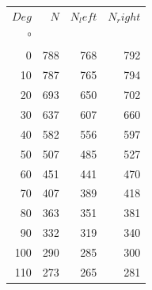 \begin{table}[H]
\begin{tabular}{rrrr}
\toprule
$Deg$ & $N$ & $N_left$ & $N_right$ \\
\si[]{\degree} & \si[]{} & \si[]{} & \si[]{} \\
\midrule
0 & 788 & 768 & 792 \\
10 & 787 & 765 & 794 \\
20 & 693 & 650 & 702 \\
30 & 637 & 607 & 660 \\
40 & 582 & 556 & 597 \\
50 & 507 & 485 & 527 \\
60 & 451 & 441 & 470 \\
70 & 407 & 389 & 418 \\
80 & 363 & 351 & 381 \\
90 & 332 & 319 & 340 \\
100 & 290 & 285 & 300 \\
110 & 273 & 265 & 281 \\
\bottomrule
\end{tabular}
\end{table}
